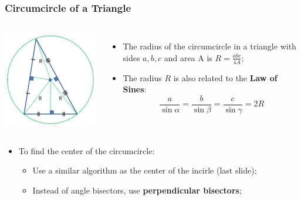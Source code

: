 \begin{frame}
  \frametitle{Circumcircle of a Triangle}
  \begin{columns}
    \includegraphics[width=1\textwidth]{../img/circumcircle_halim}
    \begin{itemize}
      \item The radius of the circumcircle in a triangle with sides $a,b,c$ and area A is $R = \frac{abc}{4A}$;
      \item The radius $R$ is also related to the {\bf Law of Sines}:
      \begin{equation*}
        \frac{a}{\sin{\alpha}} = \frac{b}{\sin{\beta}} = \frac{c}{\sin{\gamma}} = 2R
      \end{equation*}
    \end{itemize}
    \end{columns}\bigskip
    \begin{itemize}
      \item To find the center of the circumcircle:
      \begin{itemize}
        \item Use a similar algorithm as the center of the incirle (last slide);\medskip
        \item Instead of angle bisectors, use {\bf perpendicular bisectors};
      \end{itemize}
    \end{itemize}
\end{frame}
